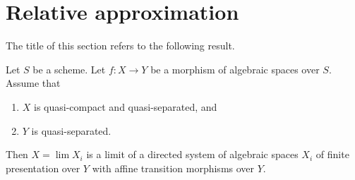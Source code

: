 \section{Relative approximation}
\label{section-relative-approximation}

\noindent
The title of this section refers to the following result.

\begin{lemma}
\label{lemma-relative-approximation}
Let $S$ be a scheme. Let $f : X \to Y$ be a morphism of algebraic spaces
over $S$. Assume that
\begin{enumerate}
\item $X$ is quasi-compact and quasi-separated, and
\item $Y$ is quasi-separated.
\end{enumerate}
Then $X = \lim X_i$ is a limit of a directed system of algebraic spaces
$X_i$ of finite presentation over $Y$ with affine transition morphisms
over $Y$.
\end{lemma}

